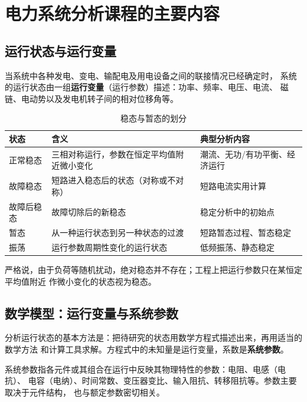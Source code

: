 
\section{电力系统分析课程的主要内容}

\subsection{运行状态与运行变量}

当系统中各种发电、变电、输配电及用电设备之间的联接情况已经确定时，
系统的运行状态由一组\textbf{运行变量}（运行参数）描述：功率、频率、电压、电流、
磁链、电动势以及发电机转子间的相对位移角等。

\begin{table}[htbp]
  \centering
  \caption{稳态与暂态的划分}
  \small
  \begin{tabular}{@{}lll@{}}
    \toprule
    状态 & 含义 & 典型分析内容 \\
    \midrule
    正常稳态 & 三相对称运行，参数在恒定平均值附近微小变化 & 潮流、无功/有功平衡、经济运行 \\
    故障稳态 & 短路进入稳态后的状态（对称或不对称） & 短路电流实用计算 \\
    故障后稳态 & 故障切除后的新稳态 & 稳定分析中的初始点 \\
    暂态 & 从一种运行状态到另一种状态的过渡 & 短路暂态过程、暂态稳定 \\
    振荡 & 运行参数周期性变化的运行状态 & 低频振荡、静态稳定 \\
    \bottomrule
  \end{tabular}
\end{table}

严格说，由于负荷等随机扰动，绝对稳态并不存在；工程上把运行参数只在某恒定平均值附近
作微小变化的状态视为稳态。

\subsection{数学模型：运行变量与系统参数}

分析运行状态的基本方法是：把待研究的状态用数学方程式描述出来，再用适当的数学方法
和计算工具求解。方程式中的未知量是运行变量，系数是\textbf{系统参数}。

系统参数指各元件或其组合在运行中反映其物理特性的参数：电阻、电感（电抗）、
电容（电纳）、时间常数、变压器变比、输入阻抗、转移阻抗等。参数主要取决于元件结构，
也与额定参数密切相关。

